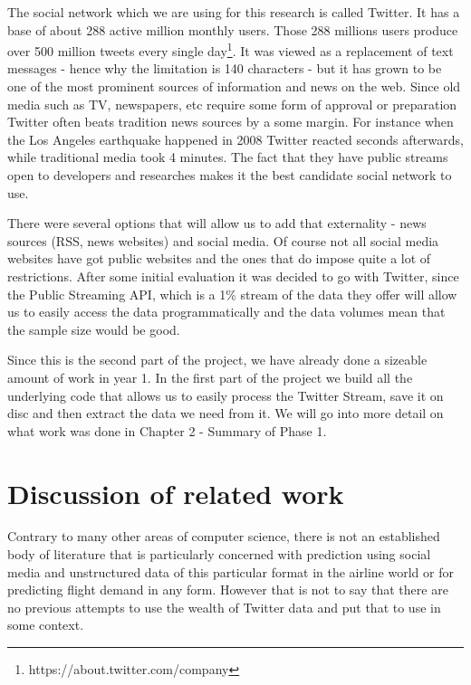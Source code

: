 \documentclass[minf,twoside,singlespacing,parskip,frontabs,notimes,12pt]{infthesis} %
\begin{document}
The social network which we are using for this research is called Twitter. 
It has a base of about 288 active million monthly users.
Those 288 millions users produce over 500 million tweets every single day\footnote{https://about.twitter.com/company}. 
It was viewed as a replacement of text messages - hence why the limitation is 140 characters - but it has grown to be one of the most prominent sources of information and news on the web. 
Since old media such as TV, newspapers, etc require some form of approval or preparation Twitter often beats tradition news sources by a some margin. 
For instance when the Los Angeles earthquake happened in 2008\cite{TwitterNewsWire} Twitter reacted seconds afterwards, while traditional media took 4 minutes. 
The fact that they have public streams open to developers and researches makes it the best candidate social network to use. 


There were several options that will allow us to add that externality - news sources (RSS, news websites) and social media. 
Of course not all social media websites have got public websites and the ones that do impose quite a lot of restrictions. 
After some initial evaluation it was decided to go with Twitter, since the Public Streaming API, which is a 1\% stream of the data they offer will allow us to easily access the data programmatically and the data volumes mean that the sample size would be good. 


Since this is the second part of the project, we have already done a sizeable amount of work in year 1. 
In the first part of the project we build all the underlying code that allows us to easily process the Twitter Stream, save it on disc and then extract the data we need from it. 
We will go into more detail on what work was done in Chapter 2 - Summary of Phase 1. 


\section{Discussion of related work}

Contrary to many other areas of computer science, there is not an established body of literature that is particularly concerned with prediction using social media and unstructured data of this particular format in the airline world or for predicting flight demand in any form. 
However that is not to say that there are no previous attempts to use the wealth of Twitter data and put that to use in some context. 
\end{document}
